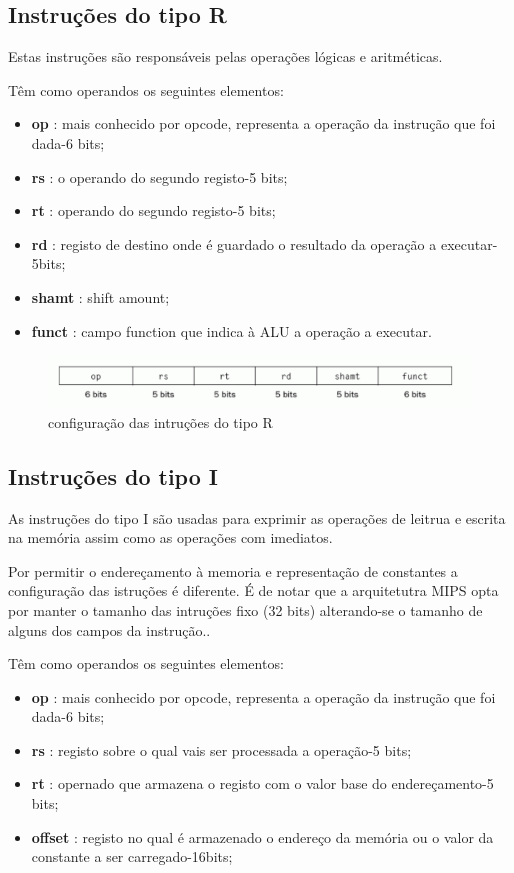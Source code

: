 \documentclass[10pt,a4paper]{book}
\begin{document}
	\subsection{Instruções do tipo R}

	Estas instruções são responsáveis pelas operações lógicas e aritméticas.

	Têm como operandos os seguintes elementos:
	 \begin{itemize}
	 	\item \textbf{op} : mais conhecido por opcode, representa a operação da instrução que foi dada-6 bits;
	 	\item \textbf{rs} : o operando do segundo registo-5 bits;
	 	\item \textbf{rt} : operando do segundo registo-5 bits;
	 	\item \textbf{rd} : registo de destino onde é guardado o resultado da operação a executar-5bits;
		\item \textbf{shamt} : shift amount;
		\item \textbf{funct} : campo function que indica à ALU a operação a executar.
	 \end{itemize}


	\begin{figure}[htp]
	    \centering
	    \includegraphics[scale=0.4]{fig1.png}
	    \caption{configuração das intruções do tipo R}
	    \label{insturçãor}
	\end{figure}



	\subsection{Instruções do tipo I}

	As instruções do tipo I são usadas para exprimir as operações de leitrua e escrita na memória assim como as operações com imediatos.

	Por permitir o endereçamento à memoria e representação de constantes a configuração das istruções é diferente.
	É de notar que a arquitetutra MIPS opta por manter o tamanho das intruções fixo (32 bits) alterando-se o tamanho de alguns dos campos da instrução..

	Têm como operandos os seguintes elementos:
	 \begin{itemize}
	 	\item \textbf{op} : mais conhecido por opcode, representa a operação da instrução que foi dada-6 bits;
	 	\item \textbf{rs} : registo sobre o qual vais ser processada a operação-5 bits;
	 	\item \textbf{rt} : opernado que armazena o registo com o valor base do endereçamento-5 bits;
	 	\item \textbf{offset} : registo no qual é armazenado o endereço da memória ou o valor da constante a ser carregado-16bits;
	 \end{itemize}
\end{document}
